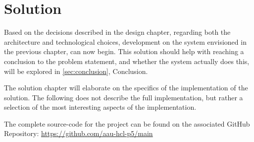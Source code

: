 \chapter{Solution}

Based on the decisions described in the design chapter, regarding both the architecture and technological choices, development on the system envisioned in the previous chapter, can now begin.
This solution should help with reaching a conclusion to the problem statement, and whether the system actually does this, will be explored in \autoref{sec:conclusion}, Conclusion.

The solution chapter will elaborate on the specifics of the implementation of the solution.
The following does not describe the full implementation, but rather a selection of the most interesting aspects of the implementation.

The complete source-code for the project can be found on the associated GitHub Repository: \url{https://github.com/aau-hcl-p5/main}







%








